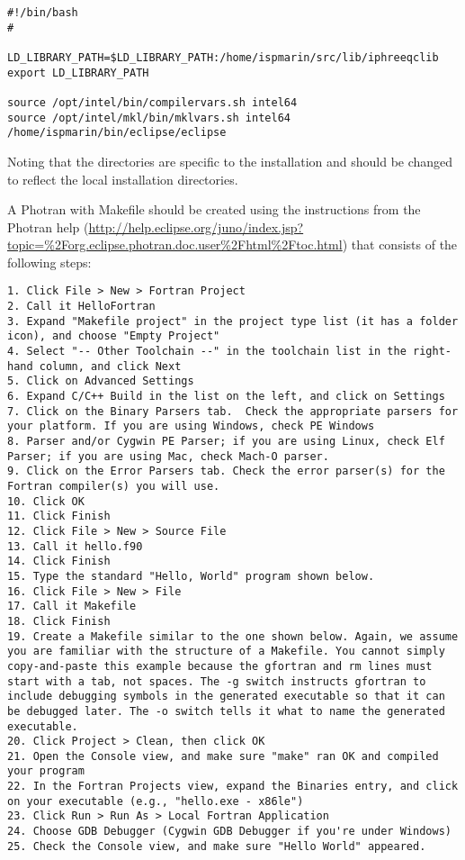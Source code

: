 \documentclass[12pt,a4paper,twoside]{report}
\begin{document}
\begin{lstlisting}[style=Bash]
#!/bin/bash
#

LD_LIBRARY_PATH=$LD_LIBRARY_PATH:/home/ispmarin/src/lib/iphreeqclib
export LD_LIBRARY_PATH

source /opt/intel/bin/compilervars.sh intel64
source /opt/intel/mkl/bin/mklvars.sh intel64
/home/ispmarin/bin/eclipse/eclipse
\end{lstlisting}

Noting that the directories are specific to the installation and should be changed to reflect the local installation directories. 

A Photran with Makefile should be created using the instructions from the Photran help (\url{http://help.eclipse.org/juno/index.jsp?topic=%2Forg.eclipse.photran.doc.user%2Fhtml%2Ftoc.html})
that consists of the following steps:

\begin{lstlisting}[style=Bash]
1. Click File > New > Fortran Project
2. Call it HelloFortran
3. Expand "Makefile project" in the project type list (it has a folder icon), and choose "Empty Project"
4. Select "-- Other Toolchain --" in the toolchain list in the right-hand column, and click Next
5. Click on Advanced Settings
6. Expand C/C++ Build in the list on the left, and click on Settings
7. Click on the Binary Parsers tab.  Check the appropriate parsers for your platform. If you are using Windows, check PE Windows 
8. Parser and/or Cygwin PE Parser; if you are using Linux, check Elf Parser; if you are using Mac, check Mach-O parser.
9. Click on the Error Parsers tab. Check the error parser(s) for the Fortran compiler(s) you will use.
10. Click OK
11. Click Finish
12. Click File > New > Source File
13. Call it hello.f90
14. Click Finish
15. Type the standard "Hello, World" program shown below.
16. Click File > New > File
17. Call it Makefile
18. Click Finish
19. Create a Makefile similar to the one shown below. Again, we assume you are familiar with the structure of a Makefile. You cannot simply copy-and-paste this example because the gfortran and rm lines must start with a tab, not spaces. The -g switch instructs gfortran to include debugging symbols in the generated executable so that it can be debugged later. The -o switch tells it what to name the generated executable.
20. Click Project > Clean, then click OK
21. Open the Console view, and make sure "make" ran OK and compiled your program
22. In the Fortran Projects view, expand the Binaries entry, and click on your executable (e.g., "hello.exe - x86le")
23. Click Run > Run As > Local Fortran Application
24. Choose GDB Debugger (Cygwin GDB Debugger if you're under Windows)
25. Check the Console view, and make sure "Hello World" appeared.
\end{lstlisting}
\end{document}

